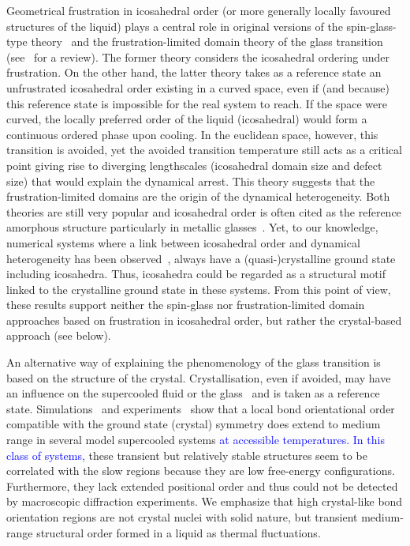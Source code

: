 Geometrical frustration in icosahedral order (or more generally locally favoured structures of the liquid) plays a central role in original versions of the spin-glass-type theory~\cite{steinhardt1983boo,sadoc1999geometrical} and the frustration-limited domain theory of the glass transition (see~\citep{tarjus2005fba} for a review). The former theory considers the icosahedral ordering under frustration. On the other hand, the latter theory takes as a reference state an unfrustrated icosahedral order existing in a curved space, even if (and because) this reference state is impossible for the real system to reach. If the space were curved, the locally preferred order of the liquid (icosahedral) would form a continuous ordered phase upon cooling. In the  euclidean space, however, this transition is avoided, yet the avoided transition temperature still acts as a critical point giving rise to diverging lengthscales (icosahedral domain size and defect size) that would explain the dynamical arrest. This theory suggests that the frustration-limited domains are the origin of the dynamical heterogeneity. Both theories are still very popular and icosahedral order is often cited as the reference amorphous structure particularly in metallic glasses~\citep{Reichert2000, Celino2007, Luo2004, Wang2011}. Yet, to our knowledge, numerical systems where a link between icosahedral order and dynamical heterogeneity has been observed~\citep{Doye2003, Pedersen2010, Coslovich2011}, always have a (quasi-)crystalline ground state including icosahedra. Thus, icosahedra could be regarded as a structural motif linked to the crystalline ground state in these systems. From this point of view, these results support neither the spin-glass nor frustration-limited domain approaches based on frustration in icosahedral order, but rather the crystal-based approach (see below).

An alternative way of explaining the phenomenology of the glass transition is based on the structure of the crystal. Crystallisation, even if avoided, may have an influence on the supercooled fluid or the glass~\citep{TanakaGJPCM, Cavagna2003, VanMegen2009a} and is taken as a reference state. Simulations~\cite{tanaka2010critical, Pedersen2010, Coslovich2011} and experiments~\citep{tanaka2010critical} show that a local bond orientational order compatible with the ground state (crystal) symmetry does extend to medium range in several model supercooled systems \textcolor{blue}{at accessible temperatures. In this class of systems,} these transient but relatively stable structures seem to be correlated with the slow regions because they are low free-energy configurations. Furthermore, they lack extended positional order and thus could not be detected by macroscopic diffraction experiments. We emphasize that high crystal-like bond orientation regions are not crystal nuclei with solid nature, but transient medium-range structural order formed in a liquid as thermal fluctuations. 

